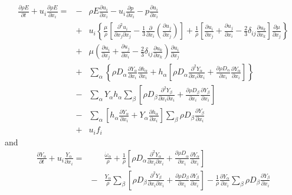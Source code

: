 \documentclass[notitlepage]{revtex4-1}
\begin{document}
\begin{eqnarray}
\frac{\partial\rho{E}}{\partial{t}}+u_{i}\frac{\partial\rho{E}}{\partial{x}_{i}}=&-&\rho{E}\frac{\partial{u}_{i}}{\partial{x}_{i}}-u_{i}\frac{\partial{p}}{\partial{x}_{i}}-p\frac{\partial{u}_{i}}{\partial{x}_{i}}\\
&+&u_{i}\left\{\frac{\mu}{\rho}\left[\frac{\partial^{2}u_{i}}{\partial{x}_{j}\partial{x}_{j}}-\frac{1}{3}\frac{\partial}{\partial{x}_{i}}\left(\frac{\partial{u}_{j}}{\partial{x}_{j}}\right)\right]+\frac{1}{\rho}\left[\frac{\partial{u}_{i}}{\partial{x}_{j}}+\frac{\partial{u}_{j}}{\partial{x}_{i}}-\frac{2}{3}\delta_{ij}\frac{\partial{u}_{k}}{\partial{x}_{k}}\right]\frac{\partial\mu}{\partial{x}_{j}}\right\}\\
&+&\mu\left(\frac{\partial{u}_{i}}{\partial{x}_{j}}+\frac{\partial{u}_{j}}{\partial{x}_{i}}-\frac{2}{3}\delta_{ij}\frac{\partial{u}_{k}}{\partial{x}_{k}}\right)\frac{\partial{u}_{i}}{\partial{x}_{j}}\\
&+&\displaystyle\sum_{\alpha}\left\{\rho{D}_{\alpha}\frac{\partial{Y}_{\alpha}}{\partial{x}_{i}}\frac{\partial{h}_{\alpha}}{\partial{x}_{i}}+{h}_{\alpha}\left[\rho{D}_{\alpha}\frac{\partial^{2}Y_{\alpha}}{\partial{x}_{i}\partial{x}_{i}}
+\frac{\partial\rho{D}_{\alpha}}{\partial{x}_{i}}\frac{\partial{Y}_{\alpha}}{\partial{x}_{i}}\right]\right\}\\
&-&\displaystyle\sum_{\alpha}{Y}_{\alpha}h_{\alpha}\displaystyle\sum_{\beta}\left[\rho{D}_{\beta}\frac{\partial^{2}{Y}_{\beta}}{\partial{x}_{i}\partial{x}_{i}}+\frac{\partial\rho{D}_{\beta}}{\partial{x}_{i}}\frac{\partial{Y}_{\beta}}{\partial{x}_{i}}\right]\\
&-&\displaystyle\sum_{\alpha}\left[h_{\alpha}\frac{\partial{Y}_{\alpha}}{\partial{x}_{i}}+Y_{\alpha}\frac{\partial{h}_{\alpha}}{\partial{x}_{i}}\right]\displaystyle\sum_{\beta}\rho{D}_{\beta}\frac{\partial{Y}_{\beta}}{\partial{x}_{i}}\\
&+&{u}_{i}{f}_{i}
\end{eqnarray}
and
\begin{eqnarray}
\frac{\partial{Y}_{\alpha}}{\partial{t}}+u_{i}\frac{{Y}_{\alpha}}{\partial{x}_{i}}=&&\frac{\dot\omega_{\alpha}}{\rho}
+\frac{1}{\rho}\left[\rho{D}_{\alpha}\frac{\partial^{2}Y_{\alpha}}{\partial{x}_{i}\partial{x}_{i}}+\frac{\partial{\rho{D}}_{\alpha}}{\partial{x}_{i}}\frac{\partial{Y}_{\alpha}}{\partial{x}_{i}}\right]\\
&-&\frac{Y_{\alpha}}{\rho}\displaystyle\sum_{\beta}\left[\rho{D}_{\beta}\frac{\partial^{2}Y_{\beta}}{\partial{x}_{i}\partial{x}_{i}}+\frac{\partial\rho{D}_{\beta}}{\partial{x}_{i}}\frac{\partial{Y}_{\beta}}{\partial{x}_{i}}\right]-\frac{1}{\rho}\frac{\partial{Y}_{\alpha}}{\partial{x}_{i}}\displaystyle\sum_{\beta}\rho{D}_{\beta}\frac{\partial{Y}_{\beta}}{\partial{x}_{i}}
\end{eqnarray}



\end{document}
